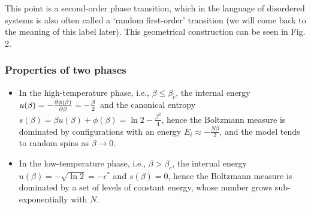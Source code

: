 \documentclass[letterpaper,english,10pt]{article}
\begin{document}
This point is a second-order phase transition, which in the language of disordered systems is also often called a `random first-order' transition (we will come back to the meaning of this label later). 
This geometrical construction can be seen in Fig. 2.

\subsubsection{Properties of two phases}
\begin{itemize}
\item In the high-temperature phase, i.e., $\beta \le \beta_c$, the internal energy $u(\beta) = -\frac{\partial \phi(\beta) }{\partial \beta} = -\frac{\beta}{2}$ and the canonical entropy $s(\beta) = \beta u(\beta) +\phi(\beta) = \ln2- \frac{\beta^2}{4}$, 
hence the Boltzmann measure is dominated by configurations with an energy $E_i \approx -\frac{N\beta}{2}$, 
and the model tends to random spins as $\beta \to 0$. 

\item In the low-temperature phase, i.e., $\beta > \beta_c$, the internal energy $u(\beta) = -\sqrt{\ln2} = -\epsilon^\ast$ and $s(\beta) = 0$, hence the Boltzmann measure is dominated by a set of levels of constant energy, whose number grows sub-exponentially with $N$. 
\end{itemize}
\end{document}
